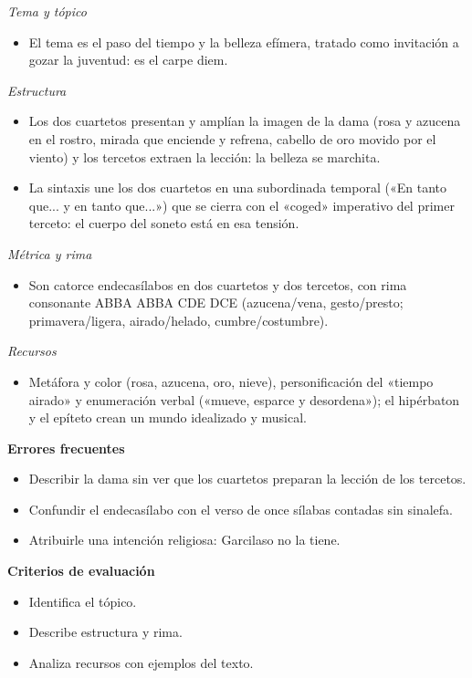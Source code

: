 \documentclass{book}
\begin{document}
\begin{tcolorbox}[title={Ejercicio resuelto}, studiumworked, breakable]
\noindent\textit{Tema y tópico}
\begin{itemize}
\item El tema es el paso del tiempo y la belleza efímera, tratado como invitación a gozar la juventud: es el carpe diem.
\end{itemize}

\noindent\textit{Estructura}
\begin{itemize}
\item Los dos cuartetos presentan y amplían la imagen de la dama (rosa y azucena en el rostro, mirada que enciende y refrena, cabello de oro movido por el viento) y los tercetos extraen la lección: la belleza se marchita.
\item La sintaxis une los dos cuartetos en una subordinada temporal («En tanto que... y en tanto que...») que se cierra con el «coged» imperativo del primer terceto: el cuerpo del soneto está en esa tensión.
\end{itemize}

\noindent\textit{Métrica y rima}
\begin{itemize}
\item Son catorce endecasílabos en dos cuartetos y dos tercetos, con rima consonante ABBA ABBA CDE DCE (azucena/vena, gesto/presto; primavera/ligera, airado/helado, cumbre/costumbre).
\end{itemize}

\noindent\textit{Recursos}
\begin{itemize}
\item Metáfora y color (rosa, azucena, oro, nieve), personificación del «tiempo airado» y enumeración verbal («mueve, esparce y desordena»); el hipérbaton y el epíteto crean un mundo idealizado y musical.
\end{itemize}

\noindent\textbf{Errores frecuentes}
\begin{itemize}
\item Describir la dama sin ver que los cuartetos preparan la lección de los tercetos.
\item Confundir el endecasílabo con el verso de once sílabas contadas sin sinalefa.
\item Atribuirle una intención religiosa: Garcilaso no la tiene.
\end{itemize}

\noindent\textbf{Criterios de evaluación}
\begin{itemize}
\item Identifica el tópico.
\item Describe estructura y rima.
\item Analiza recursos con ejemplos del texto.
\end{itemize}
\end{tcolorbox}
\end{document}
